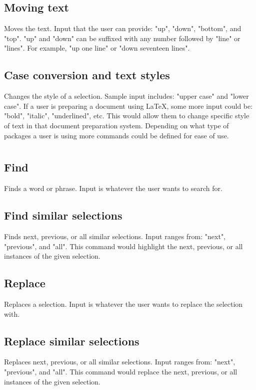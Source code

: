 \documentclass[11pt, oneside]{article}
\begin{document}
	\subsection{Moving text}
	Moves the text. Input that the user can provide: "up", "down", "bottom", and "top". "up" and "down" can be suffixed with any number followed by "line" or "lines". For example, "up one line" or "down seventeen lines".

	\subsection{Case conversion and text styles}
	Changes the style of a selection. Sample input includes: "upper case" and "lower case". If a user is preparing a document using \LaTeX, some more input could be: "bold", "italic", "underlined", etc. This would allow them to change specific style of text in that document preparation system. Depending on what type of packages a user is using more commands could be defined for ease of use.

\section{}

	\subsection{Find}
	Finds a word or phrase. Input is whatever the user wants to search for.

	\subsection{Find similar selections}
	Finds next, previous, or all similar selections. Input ranges from: "next", "previous", and "all". This command would highlight the next, previous, or all instances of the given selection.

	\subsection{Replace}
	Replaces a selection. Input is whatever the user wants to replace the selection with.

	\subsection{Replace similar selections}
	Replaces next, previous, or all similar selections. Input ranges from: "next", "previous", and "all". This command would replace the next, previous, or all instances of the given selection.
\end{document}
